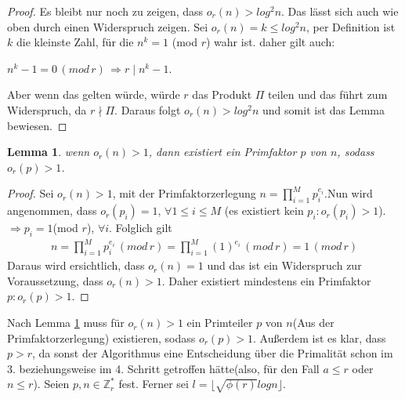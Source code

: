 \documentclass[12pt,oneside]{article}
\newtheorem{lemma}[theorem]{Lemma}
\theoremstyle{remark}
\theoremstyle{definition}
\begin{document}
\begin{proof}
Es bleibt nur noch zu zeigen, dass $o_{r}(n) > log^2 n$. Das lässt sich auch wie oben durch einen Widerspruch zeigen. Sei $o_{r}(n) = k \leq log^2 n$, per Definition ist $k$ die kleinste Zahl, für die $n^k = 1$ (mod $r$) wahr ist. daher gilt auch:\newline\newline
\centerline{$n^k - 1 = 0 \, (mod \, r) \, \Rightarrow r \mid n^k - 1$.}

Aber wenn das gelten würde, würde $r$ das Produkt $\Pi$ teilen und das führt zum Widerspruch, da $r \nmid \Pi$. Daraus folgt $o_{r}(n) > log^2 n$ und somit ist das Lemma bewiesen. 
\end{proof}

\smallskip

\begin{lemma}\label{ord_prime_l}
wenn $o_{r}(n) > 1$, dann existiert ein Primfaktor $p$ von $n$, sodass $o_{r}(p) > 1$. 
\end{lemma}
\begin{proof}
Sei $o_{r}(n) > 1$, mit der Primfaktorzerlegung $n = \prod_{i = 1}^{M} p_{i}^{e_{i}}$.\newline\newline Nun wird angenommen, dass $o_{r}(p_{i}) = 1, \, \forall 1 \leq i \leq M$ (es existiert kein $p_{i} : o_{r}(p_{i}) > 1$).\newline\newline
$\Rightarrow p_{i} = 1 $(mod $r$), $\forall i$. Folglich gilt
\begin{align*}
    n = \prod_{i = 1} ^{M} p_{i}^{e_{i}} \, (mod \, r) = \prod_{i = 1} ^{M}(1)^{e_{i}} \,  (mod \, r) = 1 \, (mod \, r)
\end{align*}
\newline\newline Daraus wird ersichtlich, dass $o_{r}(n) = 1$ und das ist ein Widerspruch zur Voraussetzung, dass $o_{r}(n) > 1$. Daher existiert mindestens ein Primfaktor $p : o_{r}(p) > 1$.  
\end{proof}

\smallskip

Nach Lemma \ref{ord_prime_l} muss für  $o_{r}(n) > 1$ ein Primteiler $p$ von $n$(Aus der Primfaktorzerlegung) existieren, sodass $o_{r}(p) > 1$. Außerdem ist es klar, dass $p > r$, da sonst der Algorithmus eine Entscheidung über die Primalität schon im 3. beziehungsweise im 4. Schritt getroffen hätte(also, für den Fall $a \leq r$ oder $n \leq r$). Seien $p,n \in \mathbb{Z}_{r}^{*}$ fest. Ferner sei  $l = \lfloor \sqrt{\phi(r)} log n \rfloor$.\newline\newline
\end{document}
